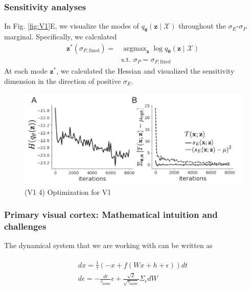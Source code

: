 \documentclass[11pt]{article}
\DeclareMathOperator*{\argmax}{argmax}
\begin{document}
\subsubsection{Sensitivity analyses}
In Fig. \ref{fig:V1}E, we visualize the modes of $q_{\bm{\theta}}(\mathbf{z} \mid \mathcal{X})$ throughout the $\sigma_E$-$\sigma_P$ marginal.
Specifically, we calculated
\begin{equation}
\begin{split}
\mathbf{z}^*(\sigma_{P,\text{fixed}}) = &\argmax_{\mathbf{z}} \log q_{\bm{\theta}}(\mathbf{z} \mid \mathcal{X}) \\
&\text{s.t. } \sigma_P = \sigma_{P,\text{fixed}}\
\end{split}
\end{equation}
At each mode $\mathbf{z}^*$, we calculated the Hessian and visualized the sensitivity dimension in the direction of positive $\sigma_E$.

\begin{figure}[h]
\caption{\small (V1 4)
Optimization for V1
 }
 \label{fig:V1_4}
\begin{center}
\includegraphics[scale=.8]{figures/figV1_4/figV1_4.pdf}
\end{center}
\end{figure}

\subsubsection{Primary visual cortex: Mathematical intuition and challenges}\label{methods_V1_complexity}

The dynamical system that we are working with can be written as 

\begin{align}\label{SSSN_agos}
\begin{split}
 dx=\frac{1}{\tau}(-x+f(W x +h+\epsilon)) dt\\
d \epsilon=-\frac{dt}{\tau_{\text{noise}}}\epsilon+\frac{\sqrt{2}}{\sqrt{\tau_{\text{noise}}}}\Sigma_\epsilon dW
\end{split}
\end{align}
\end{document}
